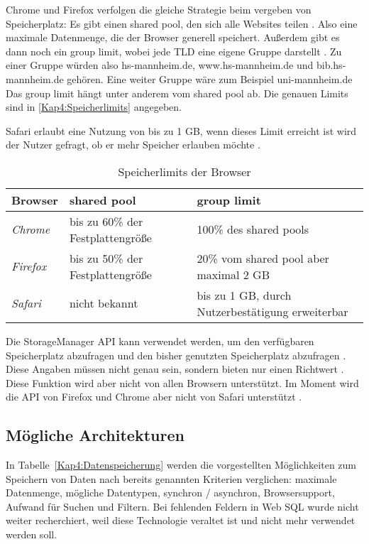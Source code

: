 Chrome und Firefox verfolgen die gleiche Strategie beim vergeben von Speicherplatz: Es gibt einen shared pool, den sich alle Websites teilen \autocite{storage-for-the-web} \autocite{mdn-browser-storage-limit}. Also eine maximale Datenmenge, die der Browser generell speichert. Außerdem gibt es dann noch ein group limit, wobei jede \ac{TLD} eine eigene Gruppe darstellt \autocite{mdn-browser-storage-limit}. Zu einer Gruppe würden also hs-mannheim.de, www.hs-mannheim.de und bib.hs-mannheim.de gehören. Eine weiter Gruppe wäre zum Beispiel uni-mannheim.de Das group limit hängt unter anderem vom shared pool ab. Die genauen Limits sind in \autoref{Kap4:Speicherlimits} angegeben.

Safari erlaubt eine Nutzung von bis zu 1 \ac{GB}, wenn dieses Limit erreicht ist wird der Nutzer gefragt, ob er mehr Speicher erlauben möchte \autocite{storage-for-the-web}. 

\begin{table}
  \renewcommand{\arraystretch}{1.2}
  \centering
  \sffamily
  \begin{footnotesize}
    \begin{tabular}{l l l}
      \toprule
      \textbf{Browser} & \textbf{shared pool} & \textbf{group limit} \\
      \midrule
      \emph{Chrome} & bis zu 60\% der Festplattengröße & 100\% des shared pools \\
      \emph{Firefox} & bis zu 50\% der Festplattengröße & 20\% vom shared pool aber maximal 2 \ac{GB} \\
      \emph{Safari} & nicht bekannt & bis zu 1 \ac{GB}, durch Nutzerbestätigung erweiterbar \\
      \bottomrule
    \end{tabular}
  \end{footnotesize}
  \rmfamily
  \caption{Speicherlimits der Browser}
  \label{Kap4:Speicherlimits}
\end{table}

Die StorageManager \ac{API} kann verwendet werden, um den verfügbaren Speicherplatz abzufragen und den bisher genutzten Speicherplatz abzufragen \autocite{storage-for-the-web}. Diese Angaben müssen nicht genau sein, sondern bieten nur einen Richtwert \autocite{storage-for-the-web}. Diese Funktion wird aber nicht von allen Browsern unterstützt. Im Moment wird die \ac{API} von Firefox und Chrome aber nicht von Safari unterstützt \autocite{mdn-storage-api}.

\subsection{Mögliche Architekturen}
In Tabelle~\ref{Kap4:Datenspeicherung} werden die vorgestellten Möglichkeiten zum Speichern von Daten nach bereits genannten Kriterien verglichen: maximale Datenmenge, mögliche Datentypen, synchron / asynchron, Browsersupport, Aufwand für Suchen und Filtern. Bei fehlenden Feldern in Web SQL wurde nicht weiter recherchiert, weil diese Technologie veraltet ist und nicht mehr verwendet werden soll.

